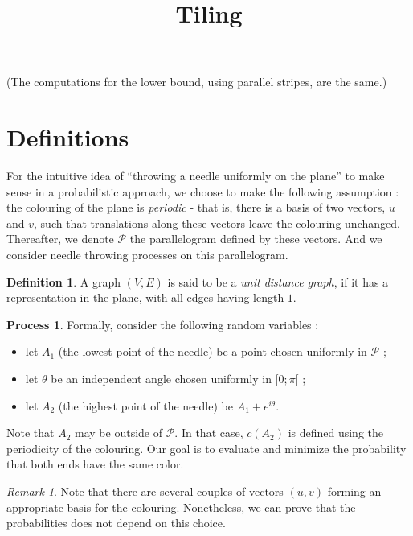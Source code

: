 \documentclass[a4paper,11pt]{article}
\title{Tiling}
\theoremstyle{definition}
\newtheorem{definition}{Definition}
\newtheorem{process}{Process}
\theoremstyle{remark}
\newtheorem{remark}{Remark}
\begin{document}
(The computations for the lower bound, using parallel stripes, are the same.)

\section{Definitions}


For the intuitive idea of ``throwing a needle uniformly on the plane'' to make sense in a probabilistic approach, we choose to make the following assumption : 
the colouring of the plane is \textit{periodic} - that is, there is a basis of two vectors, $u$ and $v$, such that translations along these vectors leave the colouring unchanged. Thereafter, we denote $\mathcal{P}$ the parallelogram defined by these vectors. And we consider needle throwing processes on this parallelogram.

\begin{definition}
A graph $(V,E) $ is said to be a \emph{unit distance graph}, if it has a representation in the plane, with all edges having length $1$.
\end{definition}


\begin{process}
Formally, consider the following random variables :
\begin{itemize}
  \item let $A_1$ (the lowest point of the needle) be a point chosen uniformly in $\mathcal{P}$ ;
  \item let $\theta$ be an independent angle chosen uniformly in $[0;\pi[$ ;
  \item let $A_2$ (the highest point of the needle) be $A_1 + e^{i \theta}$.
\end{itemize}
\end{process}

Note that $A_2$ may be outside of $\mathcal{P}$. In that case, $c(A_2)$ is defined using the periodicity of the colouring.
Our goal is to evaluate and minimize the probability that both ends have the same color.

\begin{remark}
Note that there are several couples of vectors $(u,v)$ forming an appropriate basis for the 
colouring. Nonetheless, we can prove that the probabilities does not depend on this choice. 
\end{remark}
\end{document}
